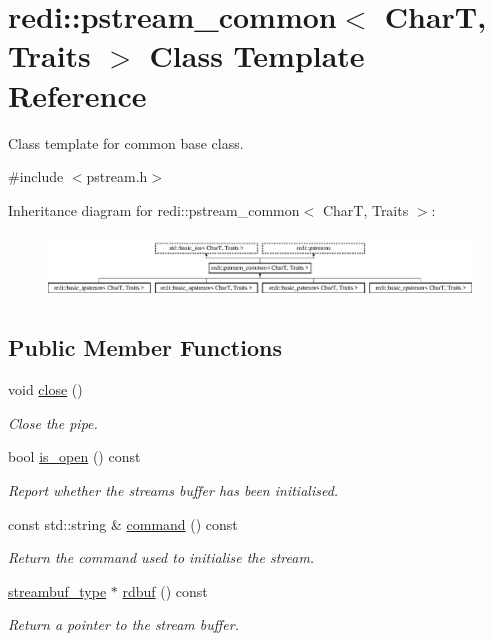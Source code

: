 \hypertarget{classredi_1_1pstream__common}{}\section{redi\+:\+:pstream\+\_\+common$<$ CharT, Traits $>$ Class Template Reference}
\label{classredi_1_1pstream__common}


Class template for common base class.  




{\ttfamily \#include $<$pstream.\+h$>$}

Inheritance diagram for redi\+:\+:pstream\+\_\+common$<$ CharT, Traits $>$\+:\begin{figure}[H]
\begin{center}
\leavevmode
\includegraphics[height=1.721312cm]{classredi_1_1pstream__common}
\end{center}
\end{figure}
\subsection*{Public Member Functions}
\begin{DoxyCompactItemize}
\item 
void \mbox{\hyperlink{classredi_1_1pstream__common_ab06458ed9aea84a33489f05ec8ed0899}{close}} ()
\begin{DoxyCompactList}\small\item\em Close the pipe. \end{DoxyCompactList}\item 
bool \mbox{\hyperlink{classredi_1_1pstream__common_a8d5ec13821e09f4bb2ab5096721551a5}{is\+\_\+open}} () const
\begin{DoxyCompactList}\small\item\em Report whether the stream\textquotesingle{}s buffer has been initialised. \end{DoxyCompactList}\item 
const std\+::string \& \mbox{\hyperlink{classredi_1_1pstream__common_acc3ad87315e0bce58714314b303b4b53}{command}} () const
\begin{DoxyCompactList}\small\item\em Return the command used to initialise the stream. \end{DoxyCompactList}\item 
\mbox{\hyperlink{classredi_1_1basic__pstreambuf}{streambuf\+\_\+type}} $\ast$ \mbox{\hyperlink{classredi_1_1pstream__common_a5414d5a3f3d91a9483d5c9128434db26}{rdbuf}} () const
\begin{DoxyCompactList}\small\item\em Return a pointer to the stream buffer. \end{DoxyCompactList}\end{DoxyCompactItemize}
